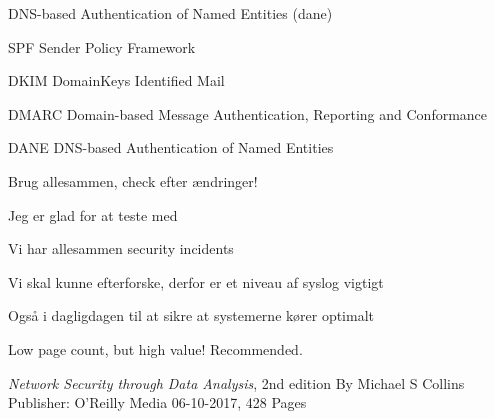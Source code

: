 \documentclass[Screen16to9,17pt]{foils}
\begin{document}
\begin{list1}
\item DNS-based Authentication of Named Entities (dane)
\end{list1}


\begin{list2}
\item SPF Sender Policy Framework\\ {\footnotesize{}}
\item DKIM DomainKeys Identified Mail\\
{\footnotesize{}}
\item DMARC Domain-based Message Authentication, Reporting and Conformance\\
{\footnotesize{}}
\item DANE DNS-based Authentication of Named Entities\\ {\footnotesize{}}
\item Brug allesammen, check efter ændringer!
\end{list2}

\centerline{Jeg er glad for at teste med }



\begin{list2}
\item Vi har allesammen security incidents
\item Vi skal kunne efterforske, derfor er et niveau af syslog vigtigt
\item Også i dagligdagen til at sikre at systemerne kører optimalt
\end{list2}




\begin{list2}
\item Low page count, but high value! Recommended.
\item \emph{Network Security through Data Analysis}, 2nd edition
By Michael S Collins Publisher: O'Reilly Media
06-10-2017, 428 Pages
\end{list2}
\end{document}
